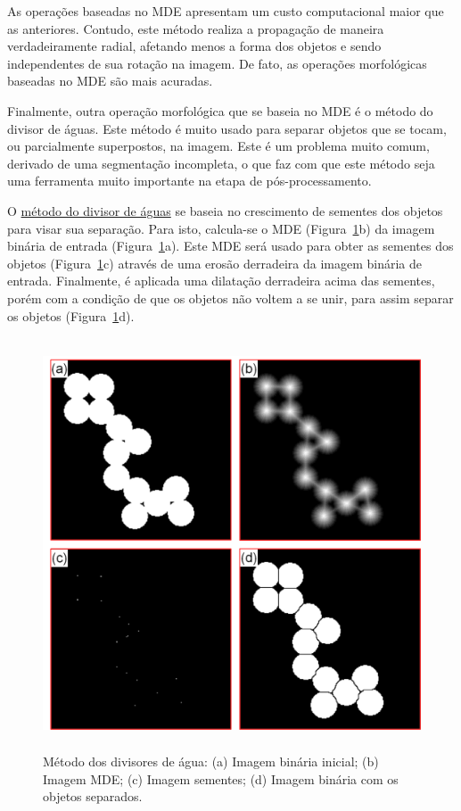 As operações baseadas no MDE apresentam um custo computacional maior
que as anteriores. Contudo, este método realiza a propagação de
maneira verdadeiramente radial, afetando menos a forma dos objetos e
sendo independentes de sua rotação na imagem. De fato, as operações
morfológicas baseadas no MDE são mais acuradas.\cite{72}

Finalmente, outra operação morfológica que se baseia no MDE é o método
do divisor de águas.\cite{103} Este método é muito usado para separar
objetos que se tocam, ou parcialmente superpostos, na imagem. Este é
um problema muito comum, derivado de uma segmentação incompleta, o que
faz com que este método seja uma ferramenta muito importante na etapa
de pós-processamento.\cite{114}

O \underline{método do divisor de águas} se baseia no crescimento de
sementes dos objetos para visar sua separação. Para isto, calcula-se o
MDE (Figura~\ref{fig:euclide-watershed}b) da imagem binária de entrada
(Figura~\ref{fig:euclide-watershed}a). Este MDE será usado para obter
as sementes dos objetos (Figura~\ref{fig:euclide-watershed}c) através
de uma erosão derradeira da imagem binária de entrada. Finalmente, é
aplicada uma dilatação derradeira acima das sementes, porém com a
condição de que os objetos não voltem a se unir, para assim separar os
objetos (Figura~\ref{fig:euclide-watershed}d).

\begin{figure} [h]
  \begin{center}
    \includegraphics[height=346pt,width=350pt]{images/fig_euclide-watershed}
    \caption{Método dos divisores de água: (a) Imagem binária inicial;
      (b) Imagem MDE; (c) Imagem sementes; (d) Imagem binária com os
      objetos separados.}\label{fig:euclide-watershed}
  \end{center}
\end{figure}

